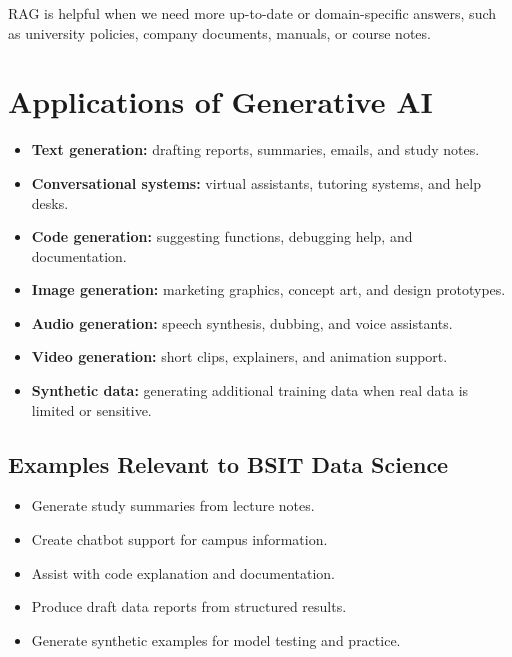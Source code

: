 \documentclass[11pt,a4paper]{article}
\begin{document}
\begin{conceptbox}
RAG is helpful when we need more up-to-date or domain-specific answers, such as university policies, company documents, manuals, or course notes.
\end{conceptbox}

\section{Applications of Generative AI}

\begin{itemize}[leftmargin=*]
  \item \textbf{Text generation:} drafting reports, summaries, emails, and study notes.
  \item \textbf{Conversational systems:} virtual assistants, tutoring systems, and help desks.
  \item \textbf{Code generation:} suggesting functions, debugging help, and documentation.
  \item \textbf{Image generation:} marketing graphics, concept art, and design prototypes.
  \item \textbf{Audio generation:} speech synthesis, dubbing, and voice assistants.
  \item \textbf{Video generation:} short clips, explainers, and animation support.
  \item \textbf{Synthetic data:} generating additional training data when real data is limited or sensitive.
\end{itemize}

\subsection{Examples Relevant to BSIT Data Science}

\begin{examplebox}
\begin{itemize}[leftmargin=*]
  \item Generate study summaries from lecture notes.
  \item Create chatbot support for campus information.
  \item Assist with code explanation and documentation.
  \item Produce draft data reports from structured results.
  \item Generate synthetic examples for model testing and practice.
\end{itemize}
\end{examplebox}
\end{document}
